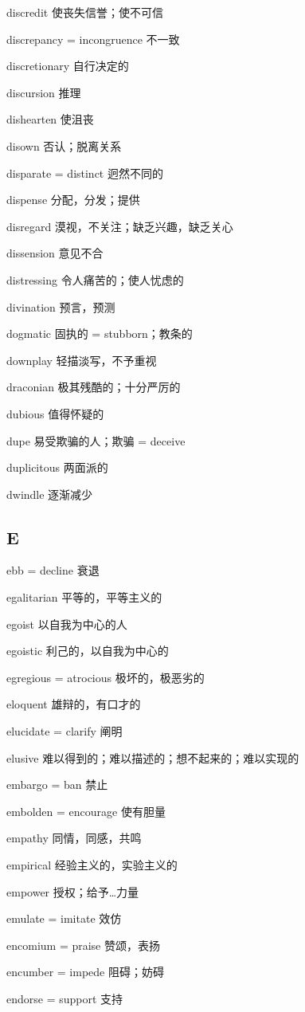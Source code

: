 \documentclass[UTF8, fontset = none, zihao = -4, linespread = 1.1]{ctexart}
\begin{document}
\begin{multicols}{2}
discredit 使丧失信誉；使不可信

discrepancy = incongruence 不一致

discretionary 自行决定的

discursion 推理

dishearten 使沮丧

disown 否认；脱离关系

disparate = distinct 迥然不同的

dispense 分配，分发；提供

disregard 漠视，不关注；缺乏兴趣，缺乏关心

dissension 意见不合

distressing 令人痛苦的；使人忧虑的

divination 预言，预测

dogmatic 固执的 = stubborn；教条的

downplay 轻描淡写，不予重视

draconian 极其残酷的；十分严厉的

dubious 值得怀疑的

dupe 易受欺骗的人；欺骗 = deceive

duplicitous 两面派的

dwindle 逐渐减少

\subsection*{E}
ebb = decline 衰退

egalitarian 平等的，平等主义的

egoist 以自我为中心的人

egoistic 利己的，以自我为中心的

egregious = atrocious 极坏的，极恶劣的

eloquent 雄辩的，有口才的

elucidate = clarify 阐明

elusive 难以得到的；难以描述的；想不起来的；难以实现的

embargo = ban 禁止

embolden = encourage 使有胆量

empathy 同情，同感，共鸣

empirical 经验主义的，实验主义的

empower 授权；给予…力量

emulate = imitate 效仿

encomium = praise 赞颂，表扬

encumber = impede 阻碍；妨碍

endorse = support 支持


\end{multicols}
\end{document}
